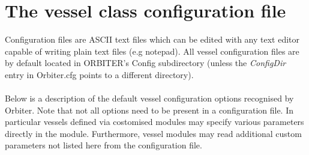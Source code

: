 \documentclass[Orbiter Developer Manual.tex]{subfiles}
\begin{document}
\section{The vessel class configuration file}
Configuration files are ASCII text files which can be edited with any text editor capable of writing plain text files (e.g notepad). All vessel configuration files are by default located in ORBITER’s Config subdirectory (unless the \textit{ConfigDir} entry in Orbiter.cfg points to a different directory).\\
\\
Below is a description of the default vessel configuration options recognised by Orbiter. Note that not all options need to be present in a configuration file. In particular vessels defined via costomised modules may specify various parameters directly in the module. Furthermore, vessel modules may read additional custom parameters not listed here from the configuration file.
\end{document}
